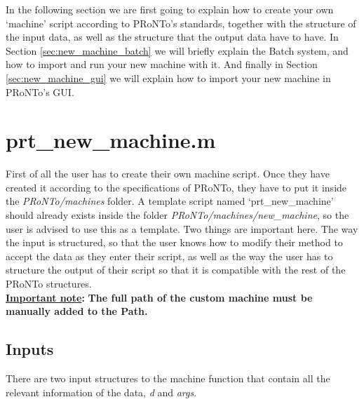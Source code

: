 In the following section we are first going to explain how to create your own `machine' script according to PRoNTo's standards, together with the structure of the input data, as well as the structure that the output data have to have. In Section \ref{sec:new_machine_batch} we will briefly explain the Batch system, and how to import and run your new machine with it. And finally in Section \ref{sec:new_machine_gui} we will explain how to import your new machine in PRoNTo's GUI.

\section{prt\_new\_machine.m}

First of all the user has to create their own machine script. Once they have created it according to the specifications of PRoNTo, they have to put it inside the \textit{PRoNTo/machines} folder. A template script named `prt\_new\_machine' should already exists inside the folder \textit{PRoNTo/machines/new\_machine}, so the user is advised to use this as a template. Two things are important here. The way the input is structured, so that the user knows how to modify their method to accept the data as they enter their script, as well as the way the user has to structure the output of their script so that it is compatible with the rest of the PRoNTo structures.
\\

\noindent \textbf{\underline{Important note}:} \textbf{The full path of the custom machine must be manually added to the \matlab{} Path.}


\subsection{Inputs}

There are two input structures to the machine function that contain all the relevant information of the data, \textit{d} and \textit{args}.

